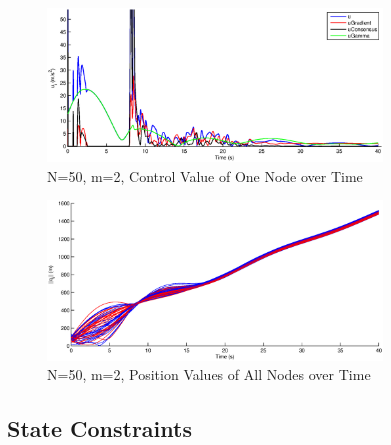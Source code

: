 \documentclass[10pt, conference, compsocconf]{IEEEtran}
\begin{document}
%
%
%

\begin{figure}[!p]
  \begin{center}
    \includegraphics[width=3.5in]{n50m2control}
  \end{center}

  \caption{\small N=50, m=2, Control Value of One Node over Time}
  \label{fig:n50m2control}
\end{figure}

\begin{figure}[!p]
  \begin{center}
    \includegraphics[width=3.5in]{n50m2position}
  \end{center}

  \caption{\small N=50, m=2, Position Values of All Nodes over Time}
  \label{fig:n50m2position}
\end{figure}


\subsection{State Constraints}
\end{document}
